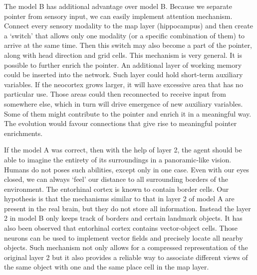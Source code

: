 \documentclass[12pt]{article}
\begin{document}
The model B has additional advantage over model B. Because we separate pointer from sensory input, we can easily implement attention mechanism. Connect every sensory modality to the map layer (hippocampus) and then create a `switch' that allows only one modality (or a specific combination of them) to arrive at the same time. Then this switch may also become a part of the pointer, along with head direction and grid cells. This mechanism is very general. It is possible to further enrich the pointer. An additional layer of working memory could be inserted into the network. Such layer could hold short-term auxiliary variables. If the neocortex grows larger, it will have excessive area that has no particular use. Those areas could then reconnected to receive input from somewhere else, which in turn will drive emergence of new auxiliary variables. Some of them might contribute to the pointer and enrich it in a meaningful way. The evolution would favour connections that give rise to meaningful pointer enrichments. 

If the model A was correct, then with the help of layer 2, the agent should be able to imagine the entirety of its surroundings in a panoramic-like vision. Humans do not poses such abilities, except only in one case. Even with our eyes closed, we can always `feel' our distance to all surrounding borders of the environment. The entorhinal cortex is known to contain border cells. Our hypothesis is that the mechanisms similar to that in layer 2 of model A are present in the real brain, but they do not store all information. Instead the layer 2 in model B only keeps track of borders and certain landmark objects. It has also been observed that entorhinal cortex contains vector-object cells. Those neurons can be used to implement vector fields and precisely locate all nearby objects. Such mechanism not only allows for a compressed representation of the original layer 2 but it also provides a reliable way to associate different views of the same object with one and the same place cell in the map layer. 
\end{document}

